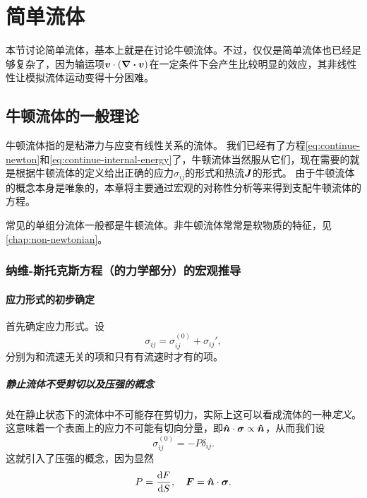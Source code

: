 \part{简单流体}

本节讨论简单流体，基本上就是在讨论牛顿流体。不过，仅仅是简单流体也已经足够复杂了，因为输运项$\vb*{v} \cdot (\div{\vb*{v}})$在一定条件下会产生比较明显的效应，其非线性性让模拟流体运动变得十分困难。

\chapter{牛顿流体的一般理论}

牛顿流体指的是粘滞力与应变有线性关系的流体。
我们已经有了方程\eqref{eq:continue-newton}和\eqref{eq:continue-internal-energy}了，牛顿流体当然服从它们，现在需要的就是根据牛顿流体的定义给出正确的应力$\sigma_{ij}$的形式和热流$\vb*{J}$的形式。
由于牛顿流体的概念本身是唯象的，本章将主要通过宏观的对称性分析等来得到支配牛顿流体的方程。

常见的单组分流体一般都是牛顿流体。非牛顿流体常常是软物质的特征，见\autoref{chap:non-newtonian}。

\section{纳维-斯托克斯方程（的力学部分）的宏观推导}

\subsection{应力形式的初步确定}

首先确定应力形式。设
\begin{equation}
    \sigma_{ij} = \sigma_{ij}^{(0)} + \sigma_{ij}',
\end{equation}
分别为和流速无关的项和只有有流速时才有的项。

\subsubsection{静止流体不受剪切以及压强的概念}

处在静止状态下的流体中不可能存在剪切力，实际上这可以看成流体的一种\emph{定义}。
这意味着一个表面上的应力不可能有切向分量，即$\vu*{n} \cdot \vb*{\sigma} \propto \vu*{n}$，从而我们设
\begin{equation}
    \sigma^{(0)}_{ij} = - P \delta_{ij}.
\end{equation}
这就引入了压强的概念，因为显然
\begin{equation}
    P = \dv{F}{S}, \quad \vb*{F} = \vu*{n} \cdot \vb*{\sigma}.
\end{equation}

